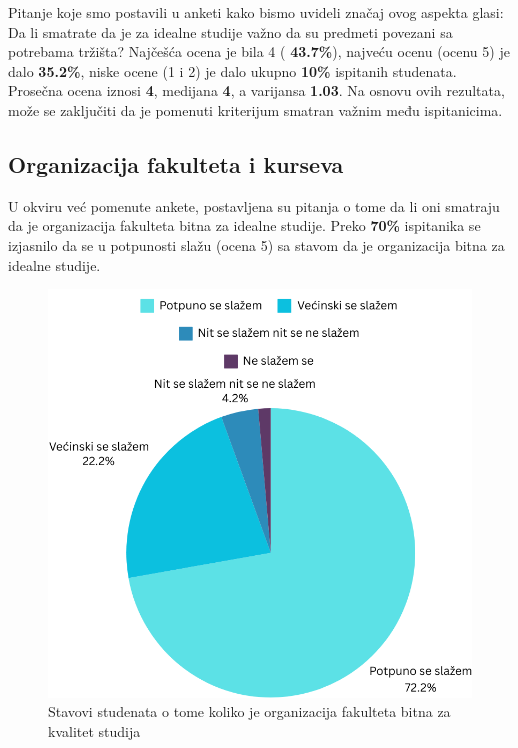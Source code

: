\documentclass[a4paper]{article}
\begin{document}
{ Pitanje koje smo postavili u anketi kako bismo uvideli značaj ovog aspekta glasi: Da li smatrate da je za idealne studije važno da su predmeti povezani sa potrebama tržišta? Najčešća ocena je bila 4 ( \textbf{43.7\%}), najveću ocenu (ocenu 5) je dalo \textbf{35.2\%}, niske ocene (1 i 2) je dalo ukupno \textbf{10\%} ispitanih studenata. Prosečna ocena iznosi \textbf{4}, medijana \textbf{4}, a varijansa \textbf{1.03}. Na osnovu ovih rezultata, može se zaključiti da je pomenuti kriterijum smatran važnim među ispitanicima.


\subsection{Organizacija fakulteta i kurseva}
\label{subsec:organizacija_stavovi}

U okviru već pomenute ankete, postavljena su pitanja o tome da li oni smatraju da je organizacija fakulteta bitna za idealne studije. Preko \textbf{70\%} ispitanika se izjasnilo da se u potpunosti slažu (ocena 5) sa stavom da je organizacija bitna za idealne studije.
\begin{figure}[h!]
\begin{center}
    \includegraphics[scale = 0.3]{PieChartOrganizacija.png}
    \caption{Stavovi studenata o tome koliko je organizacija fakulteta bitna za kvalitet studija}
    \label{fig:organizacija}
\end{center}
\end{figure}

}
\end{document}
